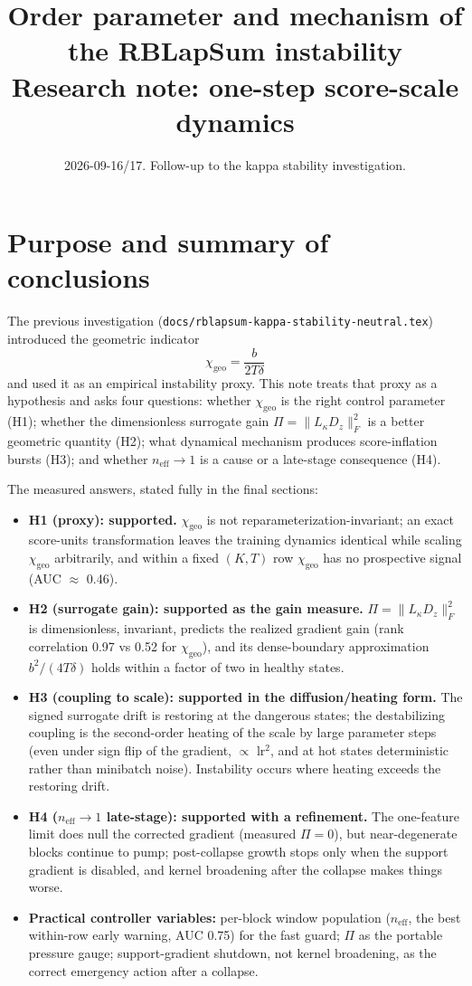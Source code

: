 \documentclass[11pt,a4paper]{article}
\title{Order parameter and mechanism of the RBLapSum
\code{through\_rank\_kappa} instability\\[2pt]
\large Research note: one-step score-scale dynamics}
\author{}
\date{2026-09-16/17. Follow-up to the kappa stability investigation.}
\newcommand{\code}[1]{\texttt{#1}}
\newcommand{\neff}{n_{\mathrm{eff}}}
\newcommand{\chigeo}{\chi_{\mathrm{geo}}}
\newcommand{\Pisurr}{\Pi}
\begin{document}
\maketitle
\vspace{-2em}
\tableofcontents

\section{Purpose and summary of conclusions}

The previous investigation (\code{docs/rblapsum-kappa-stability-neutral.tex})
introduced the geometric indicator
\[
\chigeo = \frac{b}{2T\delta}
\]
and used it as an empirical instability proxy. This note treats that proxy as
a hypothesis and asks four questions: whether \(\chigeo\) is the right control
parameter (H1); whether the dimensionless surrogate gain
\(\Pisurr = \lVert L_\kappa D_z\rVert_F^2\) is a better geometric quantity
(H2); what dynamical mechanism produces score-inflation bursts (H3); and
whether \(\neff \to 1\) is a cause or a late-stage consequence (H4).


The measured answers, stated fully in the final sections:

\begin{itemize}[leftmargin=1.4em]
\item \textbf{H1 (proxy): supported.} \(\chigeo\) is not
reparameterization-invariant; an exact score-units transformation leaves the
training dynamics identical while scaling \(\chigeo\) arbitrarily, and
within a fixed \((K,T)\) row \(\chigeo\) has no prospective signal
(AUC \(\approx\) 0.46).
\item \textbf{H2 (surrogate gain): supported as the gain measure.}
\(\Pisurr = \lVert L_\kappa D_z\rVert_F^2\) is dimensionless, invariant,
predicts the realized gradient gain (rank correlation 0.97 vs 0.52 for
\(\chigeo\)), and its dense-boundary approximation \(b^2/(4T\delta)\) holds
within a factor of two in healthy states.
\item \textbf{H3 (coupling to scale): supported in the diffusion/heating
form.} The signed surrogate drift is restoring at the dangerous states; the
destabilizing coupling is the second-order heating of the scale by large
parameter steps (even under sign flip of the gradient, \(\propto\)
lr\(^2\), and at hot states deterministic rather than minibatch noise).
Instability occurs where heating exceeds the restoring drift.
\item \textbf{H4 (\(\neff \to 1\) late-stage): supported with a
refinement.} The one-feature limit does null the corrected gradient
(measured \(\Pisurr = 0\)), but near-degenerate blocks continue to pump;
post-collapse growth stops only when the support gradient is disabled, and
kernel broadening after the collapse makes things worse.
\item \textbf{Practical controller variables:} per-block window population
(\(\neff\), the best within-row early warning, AUC 0.75) for the fast
guard; \(\Pisurr\) as the portable pressure gauge; support-gradient
shutdown, not kernel broadening, as the correct emergency action after a
collapse.
\end{itemize}
\end{document}
